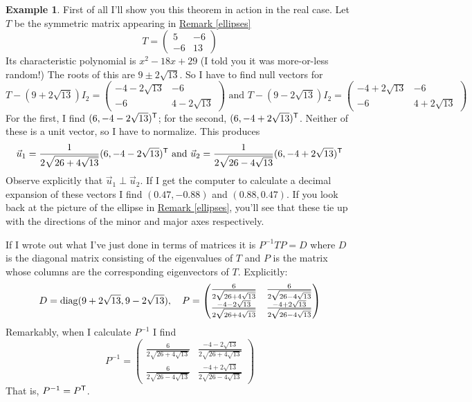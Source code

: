 \documentclass[11pt]{amsbook}
\theoremstyle{definition}
\newtheorem{ex}[theorem]{Example}
\begin{document}
\begin{ex}
First of all I'll show you this theorem in action in the real case. Let $T$ be the symmetric matrix appearing in \hyperref[ellipses]{Remark \ref{ellipses}} $$T = \begin{pmatrix} 5 & -6 \\ -6 & 13 \end{pmatrix}$$ Its characteristic polynomial is $x^2 - 18x + 29$ (I told you it was more-or-less random!) The roots of this are $9 \pm 2\sqrt{13}$. So I have to find null vectors for $$T - (9+2\sqrt{13})I_2 = \begin{pmatrix} -4 - 2\sqrt{13} & -6 \\ -6 & 4 - 2\sqrt{13} \end{pmatrix} \text{ and } T - (9-2\sqrt{13})I_2 = \begin{pmatrix} -4 + 2\sqrt{13} & -6 \\ -6 & 4 + 2\sqrt{13} \end{pmatrix} $$ For the first, I find $(6, -4-2\sqrt{13})^{\sf T}$; for the second, $(6, -4+2\sqrt{13})^{\sf T}$. Neither of these is a unit vector, so I have to normalize. This produces $$\vec{u}_1 = \frac{1}{2\sqrt{26 + 4\sqrt{13}}}(6, -4-2\sqrt{13})^{\sf T} \text{ and } \vec{u}_2 = \frac{1}{2\sqrt{26 - 4\sqrt{13}}} (6, -4+2\sqrt{13})^{\sf T}$$ Observe explicitly that $\vec{u}_1 \perp \vec{u}_2$. If I get the computer to calculate a decimal expansion of these vectors I find $(0.47,-0.88)$ and $(0.88,0.47)$. If you look back at the picture of the ellipse in \hyperref[ellipses]{Remark \ref{ellipses}}, you'll see that these tie up with the directions of the minor and major axes respectively.

If I wrote out what I've just done in terms of matrices it is $P^{-1}TP = D$ where $D$ is the diagonal matrix consisting of the eigenvalues of $T$ and $P$ is the matrix whose columns are the corresponding eigenvectors of $T$. Explicitly: $$ D = {\rm diag}(9 + 2\sqrt{13}, 9 - 2\sqrt{13}), \quad P = \begin{pmatrix} \frac{6}{2\sqrt{26 + 4\sqrt{13}}} & \frac{6}{2\sqrt{26 - 4\sqrt{13}}} \\ \frac{-4 -2\sqrt{13}}{2\sqrt{26 + 4\sqrt{13}}} & \frac{-4+2\sqrt{13}}{2\sqrt{26 - 4\sqrt{13}}} \end{pmatrix} $$
Remarkably, when I calculate $P^{-1}$ I find $$  P^{-1} = \begin{pmatrix} \frac{6}{2\sqrt{26 + 4\sqrt{13}}} & \frac{-4 -2\sqrt{13}}{2\sqrt{26 + 4\sqrt{13}}}  \\  \frac{6}{2\sqrt{26 - 4\sqrt{13}}}& \frac{-4+2\sqrt{13}}{2\sqrt{26 - 4\sqrt{13}}} \end{pmatrix} $$  That is, $P^{-1} = P^{\sf T}$.
\end{ex}
\end{document}
